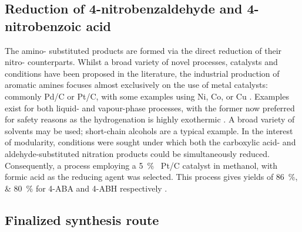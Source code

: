 
\subsection{Reduction of 4-nitrobenzaldehyde and 4-nitrobenzoic acid}

The amino- substituted products are formed via the direct reduction of their nitro- counterparts.
Whilst a broad variety of novel processes, catalysts and conditions have been proposed in the literature, the industrial production of aromatic amines focuses almost exclusively on the use of metal catalysts: commonly Pd/C or Pt/C, with some examples using Ni, Co, or Cu \cite{vogt_amines_2000,cartolano_amines_2004}.
Examples exist for both liquid- and vapour-phase processes, with the former  now preferred for safety reasons as the hydrogenation is highly exothermic \cite{vogt_amines_2000}.
A broad variety of solvents may be used; short-chain alcohols are a typical example.
In the interest of modularity, conditions were sought under which both the carboxylic acid- and aldehyde-substituted nitration products could be simultaneously reduced.
Consequently, a process employing a \SI{5}{\percent\ww} Pt/C catalyst in methanol, with formic acid as the reducing agent was selected.
This process gives yields of \SIlist{86;80}{\percent} for 4-ABA and 4-ABH respectively \cite{gowda_catalytic_2000}.	

\subsection{Finalized synthesis route} %
 
	 
	

















 



	
	
	
